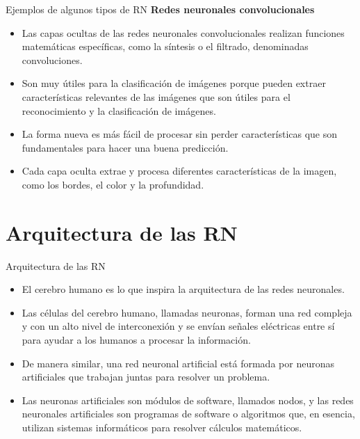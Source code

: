 \documentclass[11pt,aspectratio=169]{beamer}
\begin{document}
\begin{frame}{Ejemplos de algunos tipos de RN}
	\textbf{Redes neuronales convolucionales}\pause
	\begin{itemize}
		\item Las capas ocultas de las redes neuronales convolucionales realizan funciones matemáticas específicas, 
			como la síntesis o el filtrado, denominadas convoluciones.\pause
		\item Son muy útiles para la clasificación de imágenes porque pueden extraer características relevantes de 
			las imágenes que son útiles para el reconocimiento y la clasificación de imágenes. \pause
		\item La forma nueva es más fácil de procesar sin perder características que son fundamentales para hacer 
			una buena predicción.\pause 
		\item Cada capa oculta extrae y procesa diferentes características de la imagen, como los bordes, el color 
			y la profundidad.
	\end{itemize}
\end{frame}

\section{Arquitectura de las RN}
\begin{frame}{Arquitectura de las RN}
	\begin{itemize}
		\item El cerebro humano es lo que inspira la arquitectura de las redes neuronales. \pause
		\item Las células del cerebro humano, llamadas neuronas, forman una red compleja y con un alto nivel de interconexión 
			y se envían señales eléctricas entre sí para ayudar a los humanos a procesar la información. \pause
		\item De manera similar, una red neuronal artificial está formada por neuronas artificiales que trabajan 
			juntas para resolver un problema.\pause 
		\item Las neuronas artificiales son módulos de software, llamados nodos, y las redes neuronales artificiales son 
			programas de software o algoritmos que, en esencia, utilizan sistemas informáticos para resolver cálculos matemáticos.
	\end{itemize}
\end{frame}
\end{document}
